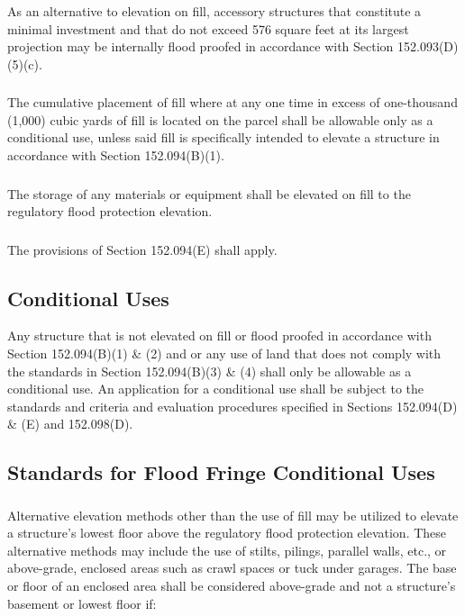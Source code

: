 \subsubsection{}
As an alternative to elevation on fill, accessory structures that constitute a minimal investment and that do not exceed 576 square feet at its largest projection may be internally flood proofed in accordance with Section 152.093(D)(5)(c).
\subsubsection{}
The cumulative placement of fill where at any one time in excess of one-thousand (1,000) cubic yards of fill is located on the parcel shall be allowable only as a conditional use, unless said fill is specifically intended to elevate a structure in accordance with Section 152.094(B)(1).
\subsubsection{}
The storage of any materials or equipment shall be elevated on fill to the regulatory flood protection elevation.
\subsubsection{}
The provisions of Section 152.094(E) shall apply.
\subsection{Conditional Uses}
Any structure that is not elevated on fill or flood proofed in accordance with Section 152.094(B)(1) \& (2) and or any use of land that does not comply with the standards in Section 152.094(B)(3) \& (4) shall only be allowable as a conditional use. An application for a conditional use shall be subject to the standards and criteria and evaluation procedures specified in Sections 152.094(D) \& (E) and 152.098(D).
\subsection{Standards for Flood Fringe Conditional Uses}
\subsubsection{}
Alternative elevation methods other than the use of fill may be utilized to elevate a structure's lowest floor above the regulatory flood protection elevation. These alternative methods may include the use of stilts, pilings, parallel walls, etc., or above-grade, enclosed areas such as crawl spaces or tuck under garages. The base or floor of an enclosed area shall be considered above-grade and not a structure's basement or lowest floor if:
